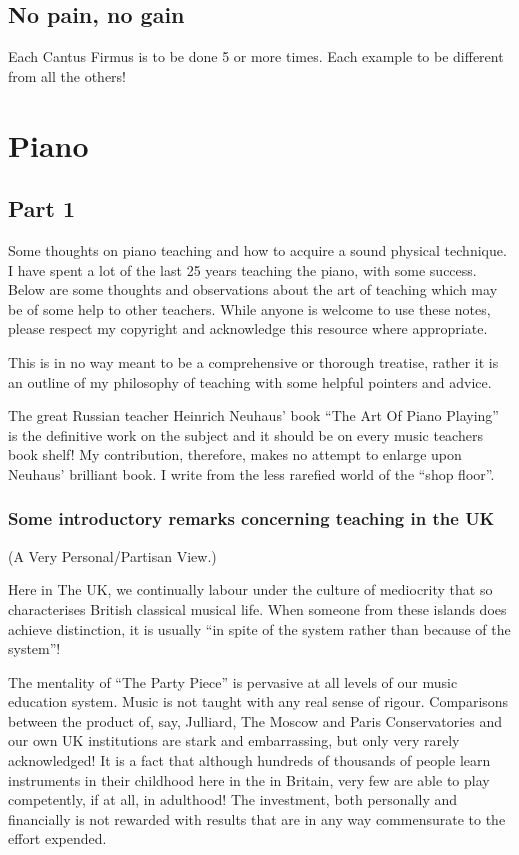 \documentclass{article}
\begin{document}
\subsection{No pain, no gain}

Each Cantus Firmus is to be done 5 or more times.
Each example to be different from all the others!

\newpage
\section{Piano}

\subsection{Part 1}

Some thoughts on piano teaching and how to acquire a sound physical technique.
I have spent a lot of the last 25 years teaching the piano, with some success.
Below are some thoughts and observations about the art of teaching which may be of some help to other teachers.
While anyone is welcome to use these notes, please respect my copyright and acknowledge this resource where appropriate.

This is in no way meant to be a comprehensive or thorough treatise, rather it is an outline of my philosophy of teaching with some helpful pointers and advice.

The great Russian teacher Heinrich Neuhaus’ book ``The Art Of Piano Playing'' is the definitive work on the subject and it should be on every music teachers book shelf!
My contribution, therefore, makes no attempt to enlarge upon Neuhaus’ brilliant book.
I write from the less rarefied world of the ``shop floor''.

\subsubsection{Some introductory remarks concerning teaching in the UK}

(A Very Personal/Partisan View.)

Here in The UK, we continually labour under the culture of mediocrity that so characterises British classical musical life.
When someone from these islands does achieve distinction, it is usually ``in spite of the system rather than because of the system''!

The mentality of ``The Party Piece'' is pervasive at all levels of our music education system.
Music is not taught with any real sense of rigour.
Comparisons between the product of, say, Julliard, The Moscow and Paris Conservatories and our own UK institutions are stark and embarrassing, but only very rarely acknowledged!
It is a fact that although hundreds of thousands of people learn instruments in their childhood here in the in Britain, very few are able to play competently, if at all, in adulthood!
The investment, both personally and financially is not rewarded with results that are in any way commensurate to the effort expended.
\end{document}
